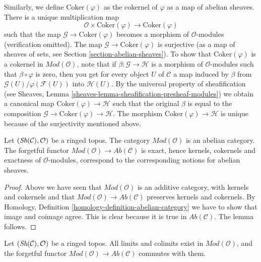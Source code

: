 \medskip\noindent
Similarly, we define $\text{Coker}(\varphi)$ as the cokernel of
$\varphi$ as a map of abelian sheaves. There is a unique
multiplication map
$$
\mathcal{O} \times \text{Coker}(\varphi) \longrightarrow \text{Coker}(\varphi)
$$
such that the map $\mathcal{G} \to \text{Coker}(\varphi)$ becomes a
morphism of $\mathcal{O}$-modules (verification omitted).
The map $\mathcal{G} \to \text{Coker}(\varphi)$ is surjective
(as a map of sheaves of sets, see Section \ref{section-abelian-sheaves}).
To show that $\text{Coker}(\varphi)$ is a cokernel in
$\textit{Mod}(\mathcal{O})$, note that if
$\beta : \mathcal{G} \to \mathcal{H}$ is a morphism of $\mathcal{O}$-modules
such that $\beta \circ \varphi$ is zero, then you get for every
object $U$ of $\mathcal{C}$ a map induced by $\beta$ from
$\mathcal{G}(U)/\varphi(\mathcal{F}(U))$ into $\mathcal{H}(U)$.
By the universal property of sheafification (see
Sheaves, Lemma \ref{sheaves-lemma-sheafification-presheaf-modules})
we obtain a canonical map $\text{Coker}(\varphi) \to \mathcal{H}$
such that the original $\beta$ is equal to the composition
$\mathcal{G} \to \text{Coker}(\varphi) \to \mathcal{H}$.
The morphism $\text{Coker}(\varphi) \to \mathcal{H}$ is unique
because of the surjectivity mentioned above.

\begin{lemma}
\label{lemma-abelian}
Let $(\mathop{\textit{Sh}}\nolimits(\mathcal{C}), \mathcal{O})$ be a ringed topos.
The category $\textit{Mod}(\mathcal{O})$ is an abelian category.
The forgetful functor
$\textit{Mod}(\mathcal{O}) \to \textit{Ab}(\mathcal{C})$
is exact, hence kernels, cokernels and exactness of
$\mathcal{O}$-modules, correspond to the corresponding notions
for abelian sheaves.
\end{lemma}

\begin{proof}
Above we have seen that $\textit{Mod}(\mathcal{O})$ is an additive
category, with kernels and cokernels
and that $\textit{Mod}(\mathcal{O}) \to \textit{Ab}(\mathcal{C})$
preserves kernels and cokernels.
By Homology, Definition \ref{homology-definition-abelian-category}
we have to show that image and coimage agree. This is clear
because it is true in $\textit{Ab}(\mathcal{C})$. The lemma follows.
\end{proof}

\begin{lemma}
\label{lemma-limits-colimits}
Let $(\mathop{\textit{Sh}}\nolimits(\mathcal{C}), \mathcal{O})$ be a ringed topos.
All limits and colimits exist in $\textit{Mod}(\mathcal{O})$, and
the forgetful functor
$\textit{Mod}(\mathcal{O}) \to \textit{Ab}(\mathcal{C})$
commutes with them.
\end{lemma}

